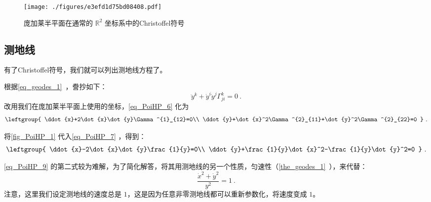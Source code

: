\begin{figure}[ht]
\centering
\texttt{[image: ./figures/e3efd1d75bd08408.pdf]}
\caption{庞加莱半平面在通常的 $\mathbb{R}^2$ 坐标系中的Christoffel符号} \label{fig_PoiHP_1}
\end{figure}


\subsection{测地线}


有了Christoffel符号，我们就可以列出测地线方程了。

根据\autoref{eq_geodes_1}~，誊抄如下：
\begin{equation}\label{eq_PoiHP_6}
\ddot{y}^k+\dot{y}^i\dot{y}^j\Gamma^k_{ji}=0~.
\end{equation}
改用我们在庞加莱半平面上使用的坐标，\autoref{eq_PoiHP_6} 化为
\begin{equation}\label{eq_PoiHP_7}
\leftgroup{
    \ddot{x}+2\dot{x}\dot{y}\Gamma^{1}_{12}=0\\
    \ddot{y}+\dot{x}^2\Gamma^{2}_{11}+\dot{y}^2\Gamma^{2}_{22}=0
}~.
\end{equation}

将\autoref{fig_PoiHP_1} 代入\autoref{eq_PoiHP_7} ，得到：
\begin{equation}\label{eq_PoiHP_9}
\leftgroup{
    \ddot{x}-2\dot{x}\dot{y}\frac{1}{y}=0\\
    \ddot{y}+\frac{1}{y}\dot{x}^2-\frac{1}{y}\dot{y}^2=0
}~.
\end{equation}

\autoref{eq_PoiHP_9} 的第二式较为难解，为了简化解答，将其用测地线的另一个性质，匀速性（\autoref{the_geodes_1}~），来代替：
\begin{equation}\label{eq_PoiHP_8}
\frac{\dot{x}^2+\dot{y}^2}{y^2}=1~.
\end{equation}
注意，这里我们设定测地线的速度总是 $1$，这是因为任意非零测地线都可以重新参数化，将速度变成 $1$。

